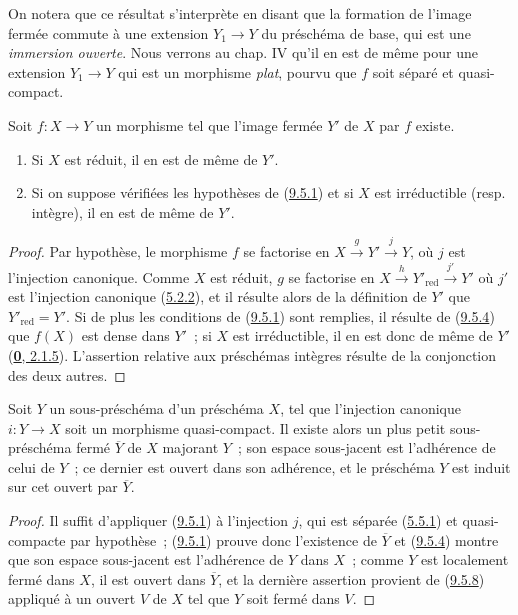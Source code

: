 On notera que ce résultat s'interprète en disant que la formation de l'image
fermée commute à une extension $Y_1\to Y$ du préschéma de base, qui est une
\emph{immersion ouverte}. Nous verrons au chap. IV qu'il en est de même pour
une extension $Y_1\to Y$ qui est un morphisme \emph{plat}, pourvu que $f$
soit séparé et quasi-compact.

\begin{proposition}[9.5.9]
\label{I.9.5.9-fr}
Soit $f:X\to Y$ un morphisme tel que l'image fermée $Y'$ de $X$ par $f$
existe.
\begin{enumerate}
  \item[\textup{(i)}] Si $X$ est réduit, il en est de même de $Y'$.
  \item[\textup{(ii)}] Si on suppose vérifiées les hypothèses de
    (\hyperref[I.9.5.1-fr]{9.5.1}) et si $X$ est irréductible \textup{(resp.}
    intègre), il en est de même de $Y'$.
\end{enumerate}
\end{proposition}

\begin{proof}
Par hypothèse, le morphisme $f$ se factorise en
$X\xrightarrow{g}Y'\xrightarrow{j}Y$, où $j$ est l'injection canonique.
Comme $X$ est réduit, $g$ se factorise en
$X\xrightarrow{h}Y'_{\mathrm{red}}\xrightarrow{j'}Y'$ où $j'$ est
l'injection canonique (\hyperref[I.5.2.2-fr]{5.2.2}), et il résulte alors de
la définition de $Y'$ que $Y'_{\mathrm{red}}=Y'$. Si de plus les conditions
de (\hyperref[I.9.5.1-fr]{9.5.1}) sont remplies, il résulte de
(\hyperref[I.9.5.4-fr]{9.5.4}) que $f(X)$ est dense dans $Y'$~; si $X$ est
irréductible, il en est donc de même de $Y'$
(\hyperref[0.2.1.5-fr]{\textbf{0}, 2.1.5}). L'assertion relative aux préschémas
intègres résulte de la conjonction des deux autres.
\end{proof}

\begin{proposition}[9.5.10]
\label{I.9.5.10-fr}
Soit $Y$ un sous-préschéma d'un préschéma $X$, tel que l'injection canonique
$i:Y\to X$ soit un morphisme quasi-compact. Il existe alors un plus petit
sous-préschéma fermé $\overline{Y}$ de $X$ majorant $Y$~; son espace
sous-jacent est l'adhérence de celui de $Y$~; ce dernier est ouvert dans son
adhérence, et le préschéma $Y$ est induit sur cet ouvert par $\overline{Y}$.
\end{proposition}

\begin{proof}
Il suffit d'appliquer (\hyperref[I.9.5.1-fr]{9.5.1}) à l'injection $j$, qui
est séparée (\hyperref[I.5.5.1-fr]{5.5.1}) et quasi-compacte par hypothèse~;
(\hyperref[I.9.5.1-fr]{9.5.1}) prouve donc l'existence de $\overline{Y}$ et
(\hyperref[I.9.5.4-fr]{9.5.4}) montre que son espace sous-jacent est
l'adhérence de $Y$ dans $X$~; comme $Y$ est localement fermé dans $X$, il
est ouvert dans $\overline{Y}$, et la dernière assertion provient de
(\hyperref[I.9.5.8-fr]{9.5.8}) appliqué à un ouvert $V$ de $X$ tel que $Y$
soit fermé dans $V$.
\end{proof}


